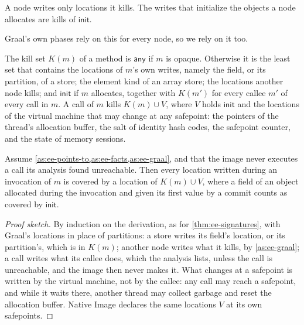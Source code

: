 \begin{assumption}\label{as:ee-graal}
A node writes only locations it kills. The writes that initialize the objects a
node allocates are kills of $\mathsf{init}$.
\end{assumption}

Graal's own phases rely on this for every node, so we rely on it too.

\begin{definition}\label{def:ee-kill-set}
The kill set $K(m)$ of a method is $\mathsf{any}$ if $m$ is opaque. Otherwise it
is the least set that contains the locations of $m$'s own writes, namely the
field, or its partition, of a store; the element kind of an array store; the
locations another node kills; and $\mathsf{init}$ if $m$ allocates, together with
$K(m')$ for every callee $m'$ of every call in $m$. A call of $m$ kills
$K(m) \cup V$, where $V$ holds $\mathsf{init}$ and the locations of the virtual
machine that may change at any safepoint: the pointers of the thread's
allocation buffer, the salt of identity hash codes, the safepoint counter, and
the state of memory sessions.
\end{definition}

\begin{theorem}\label{thm:ee-kills}
Assume \cref{as:ee-points-to,as:ee-facts,as:ee-graal}, and that the image never
executes a call its analysis found unreachable. Then every location written
during an invocation of $m$ is covered by a location of $K(m) \cup V$, where a
field of an object allocated during the invocation and given its first value by
a commit counts as covered by $\mathsf{init}$.
\end{theorem}

\begin{proof}[Proof sketch]
By induction on the derivation, as for \cref{thm:ee-signatures}, with Graal's
locations in place of partitions: a store writes its field's location, or its
partition's, which is in $K(m)$; another node writes what it kills, by
\cref{as:ee-graal}; a call writes what its callee does, which the analysis
lists, unless the call is unreachable, and the image then never makes it. What
changes at a safepoint is written by the virtual machine, not by the callee:
any call may reach a safepoint, and while it waits there, another thread may
collect garbage and reset the allocation buffer. Native Image declares the same
locations $V$ at its own safepoints.
\end{proof}

